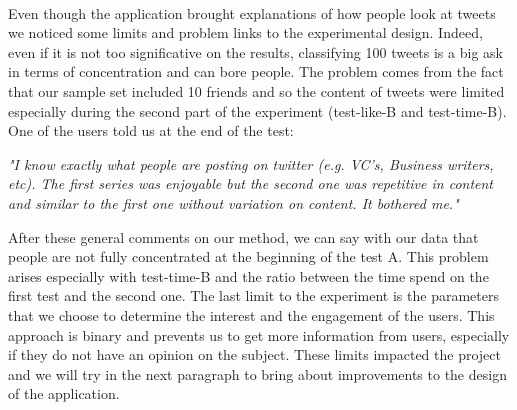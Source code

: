 \paragraph{}
Even though the application brought explanations of how people look at tweets we noticed some limits and problem links to the experimental design. Indeed, even if it is not too significative on the results, classifying 100 tweets is a big ask in terms of concentration and can bore people. The problem comes from the fact that our sample set included 10 friends and so the content of tweets were limited especially during the second part of the experiment (test-like-B and test-time-B). One of the users told us at the end of the test:

\begin{center}
\textit{"I know exactly what people are posting on twitter (e.g. VC's, Business writers, etc). The first series was enjoyable but the second one was repetitive in content and similar to the first one without variation on content. It bothered me."}
\end{center}

After these general comments on our method, we can say with our data that people are not fully concentrated at the beginning of the test A. This problem arises especially with test-time-B and the ratio between the time spend on the first test and the second one.
The last limit to the experiment is the parameters that we choose to determine the interest and the engagement of the users. This approach is binary and prevents us to get more information from users, especially if they do not have an opinion on the subject.
These limits impacted the project and we will try in the next paragraph to bring about improvements to the design of the application.

